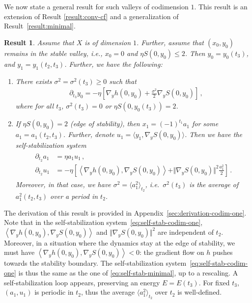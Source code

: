 \documentclass[11pt,english,reqno]{article}
\renewcommand{\leq}{\leqslant}
\renewcommand{\geq}{\geqslant}
\theoremstyle{plain}
\newtheorem{result}[proposition]{Result}
\theoremstyle{definition}
\theoremstyle{remark}
\numberwithin{equation}{section}
\begin{document}
We now state a general result for such valleys of codimension $1$. This result is an extension of Result \ref{result:conv-cf} and a generalization of Result~\ref{result:minimal}. 

\begin{result}
    \label{result:codim-one}
    Assume that $X$ is of dimension $1$. Further, assume that $(x_0, y_0)$ remains in the stable valley, i.e., $x_0 = 0$ and $\eta S(0,y_0) \leq 2$. Then $y_0 = y_0(t_3)$, and $y_1 = y_1(t_2, t_3)$. Further, we have the following:
\begin{enumerate}[label=(\roman*)]
    \item\label{it:codim-one-1} There exists $\sigma^2 = \sigma^2(t_3) \geq 0$ such that 
    \begin{align*}
        &\partial_{t_3} y_0 = - \eta \left[\nabla_y h(0, y_0) + \frac{\sigma^2}{2} \nabla_y S(0, y_0)\right] \, , 
    \end{align*}
    where for all $t_3$, $\sigma^2(t_3) = 0$ or $\eta S(0, y_0(t_3)) = 2$.
    \item\label{it:codim-one-2} If $\eta S(0, y_0) = 2$ (edge of stability), then $x_1 = (-1)^{t_1} a_1$ for some $a_1 = a_1(t_2, t_3)$. Further, denote $u_1 = \langle y_1, \nabla_y S(0, y_0) \rangle$. Then we have the self-stabilization system
    \begin{align}
        \label{eq:self-stab-codim-one}
        \begin{split}
        \partial_{t_2} a_1 &= \eta a_1 u_1 \, , \\
        \partial_{t_2} u_1 &= - \eta \left[\left\langle \nabla_y h(0, y_0), \nabla_y S(0, y_0) \right\rangle + \Vert \nabla_y S(0, y_0) \Vert^2 \frac{a_1^2}{2} \right] \, .
        \end{split}
    \end{align}
    Moreover, in that case, we have $\sigma^2 = \langle a_1^2 \rangle_{t_2}$, i.e.~$\sigma^2(t_3)$ is the average of $a_1^2(t_2, t_3)$ over a period in $t_2$.
    \end{enumerate}
    \end{result}

    The derivation of this result is provided in Appendix~\ref{sec:derivation-codim-one}. Note that in the self-stabilization system~\eqref{eq:self-stab-codim-one}, $\left\langle \nabla_y h(0, y_0), \nabla_y S(0, y_0) \right\rangle$ and $\Vert \nabla_y S(0, y_0) \Vert^2$ are independent of $t_2$. Moreover, in a situation where the dynamics stay at the edge of stability, we must have $\left\langle \nabla_y h(0, y_0), \nabla_y S(0, y_0) \right\rangle < 0$: the gradient flow on $h$ pushes towards the stability boundary. The self-stabilization system~\eqref{eq:self-stab-codim-one} is thus the same as the one of \eqref{eq:self-stab-minimal}, up to a rescaling. A self-stabilization loop appears, preserving an energy $E = E(t_3)$. For fixed $t_3$, $(a_1, u_1)$ is periodic in $t_2$, thus the average $\langle a_1^2 \rangle_{t_2}$ over $t_2$ is well-defined. 
\end{document}
